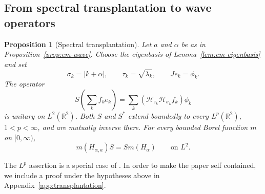 \documentclass[11pt,a4paper,reqno,backref=page]{amsart}
\newcommand{\R}{\mathbb R}
\newcommand{\HH}{\mathcal H}                 %
\numberwithin{equation}{section}
\newtheorem{proposition}[theorem]{Proposition}
\theoremstyle{definition}
\theoremstyle{remark}
\begin{document}
\subsection{From spectral transplantation to wave operators}

\begin{proposition}[Spectral transplantation]
\label{prop:em-transplantation}
  Let $a$ and $\alpha$ be as in
  Proposition~\ref{prop:em-wave}. Choose the eigenbasis of
  Lemma~\ref{lem:em-eigenbasis} and set
  \begin{equation*}
    \sigma_k=|k+\alpha|,\qquad \tau_k=\sqrt{\lambda_k},
    \qquad Je_k=\phi_k.
  \end{equation*}
  The operator
  \begin{equation}\label{eq:em-S}
    S\left(\sum_k f_ke_k\right)
    =\sum_k(\HH_{\tau_k}\HH_{\sigma_k}f_k)\phi_k
  \end{equation}
  is unitary on $L^2(\R^2)$. Both $S$ and $S^*$ extend
  boundedly to every $L^p(\R^2)$, $1<p<\infty$, and are
  mutually inverse there. For every bounded Borel function
  $m$ on $[0,\infty)$,
  \begin{equation*}
    m(H_{\alpha,a})S=Sm(H_\alpha)\qquad\text{on }L^2.
  \end{equation*}
\end{proposition}


The $L^p$ assertion is a special case of
\cite[Theorem~2.13]{FSWZZ2026}. In order to make the paper
self contained, we include a proof under the hypotheses above 
in Appendix~\ref{app:transplantation}.
\end{document}
